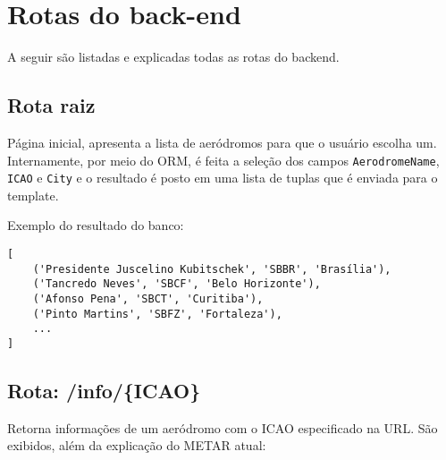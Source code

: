 \chapter{Rotas do back-end}

A seguir são listadas e explicadas todas as rotas do backend.

\section{Rota raiz}

Página inicial, apresenta a lista de aeródromos para que o usuário escolha um. 
Internamente, por meio do ORM, é feita a seleção dos campos \texttt{AerodromeName},
\texttt{ICAO} e \texttt{City} e o resultado é posto em uma lista de tuplas que é 
enviada para o template.

Exemplo do resultado do banco:
\begin{verbatim}
[
    ('Presidente Juscelino Kubitschek', 'SBBR', 'Brasília'), 
    ('Tancredo Neves', 'SBCF', 'Belo Horizonte'), 
    ('Afonso Pena', 'SBCT', 'Curitiba'), 
    ('Pinto Martins', 'SBFZ', 'Fortaleza'), 
    ...
]
\end{verbatim}

\section{Rota: /info/\{ICAO\}}

Retorna informações de um aeródromo com o ICAO especificado na URL. São exibidos,
além da explicação do METAR atual:

